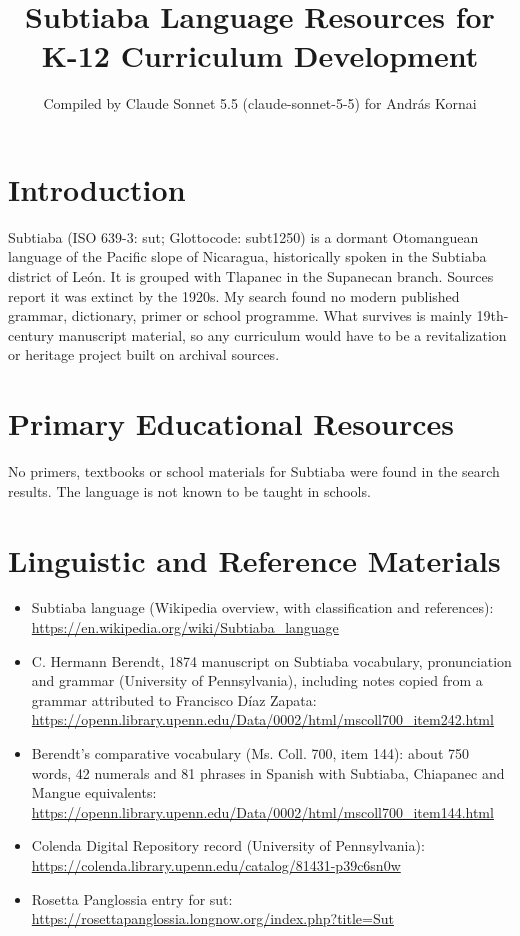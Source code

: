 \documentclass[12pt]{article}
\title{Subtiaba Language Resources for K-12 Curriculum Development}
\author{Compiled by Claude Sonnet 5.5 (claude-sonnet-5-5) for Andr\'as Kornai}
\date{}
\begin{document}
\maketitle

\section{Introduction}
Subtiaba (ISO 639-3: sut; Glottocode: subt1250) is a dormant Otomanguean language of the Pacific slope of Nicaragua, historically spoken in the Subtiaba district of Le\'on. It is grouped with Tlapanec in the Supanecan branch. Sources report it was extinct by the 1920s. My search found no modern published grammar, dictionary, primer or school programme. What survives is mainly 19th-century manuscript material, so any curriculum would have to be a revitalization or heritage project built on archival sources.

\section{Primary Educational Resources}
No primers, textbooks or school materials for Subtiaba were found in the search results. The language is not known to be taught in schools.

\section{Linguistic and Reference Materials}
\begin{itemize}
\item Subtiaba language (Wikipedia overview, with classification and references): \url{https://en.wikipedia.org/wiki/Subtiaba_language}
\item C. Hermann Berendt, 1874 manuscript on Subtiaba vocabulary, pronunciation and grammar (University of Pennsylvania), including notes copied from a grammar attributed to Francisco D\'iaz Zapata: \url{https://openn.library.upenn.edu/Data/0002/html/mscoll700_item242.html}
\item Berendt's comparative vocabulary (Ms. Coll. 700, item 144): about 750 words, 42 numerals and 81 phrases in Spanish with Subtiaba, Chiapanec and Mangue equivalents: \url{https://openn.library.upenn.edu/Data/0002/html/mscoll700_item144.html}
\item Colenda Digital Repository record (University of Pennsylvania): \url{https://colenda.library.upenn.edu/catalog/81431-p39c6sn0w}
\item Rosetta Panglossia entry for sut: \url{https://rosettapanglossia.longnow.org/index.php?title=Sut}
\end{itemize}
\end{document}
